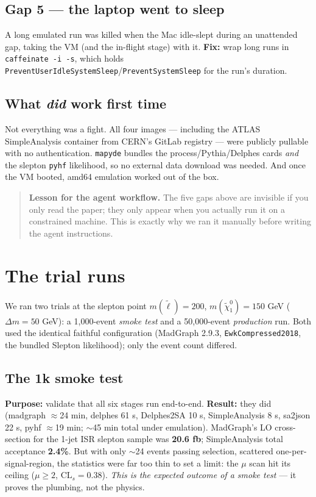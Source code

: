 \documentclass[11pt,oneside]{report}
\newcommand{\code}[1]{\texttt{#1}}
\begin{document}
\section{Gap 5 --- the laptop went to sleep}
A long emulated run was killed when the Mac idle-slept during an unattended gap, taking the VM (and
the in-flight stage) with it. \textbf{Fix:} wrap long runs in \code{caffeinate -i -s}, which holds
\code{PreventUserIdleSystemSleep}/\code{PreventSystemSleep} for the run's duration.

\section{What \emph{did} work first time}
Not everything was a fight. All four images --- including the ATLAS SimpleAnalysis container from
CERN's GitLab registry --- were publicly pullable with no authentication. \code{mapyde} bundles the
process/Pythia/Delphes cards \emph{and} the slepton \code{pyhf} likelihood, so no external data
download was needed. And once the VM booted, amd64 emulation worked out of the box.

\begin{quote}\textbf{Lesson for the agent workflow.} The five gaps above are invisible if you only
read the paper; they only appear when you actually run it on a constrained machine. This is exactly
why we ran it manually before writing the agent instructions.\end{quote}

\chapter{The trial runs}
\label{ch:runs}
We ran two trials at the slepton point $m(\tilde\ell)=200$, $m(\tilde\chi^0_1)=150$ GeV
($\Delta m = 50$ GeV): a 1{,}000-event \emph{smoke test} and a 50{,}000-event \emph{production} run.
Both used the identical faithful configuration (MadGraph 2.9.3, \code{EwkCompressed2018}, the bundled
Slepton likelihood); only the event count differed.

\section{The 1k smoke test}
\textbf{Purpose:} validate that all six stages run end-to-end. \textbf{Result:} they did
(madgraph $\approx$24 min, delphes 61 s, Delphes2SA 10 s, SimpleAnalysis 8 s, sa2json 22 s,
pyhf $\approx$19 min; $\sim$45 min total under emulation). MadGraph's LO cross-section for the
1-jet ISR slepton sample was \textbf{20.6 fb}; SimpleAnalysis total acceptance \textbf{2.4\%}.
But with only $\sim$24 events passing selection, scattered one-per-signal-region, the statistics
were far too thin to set a limit: the $\mu$ scan hit its ceiling ($\mu\ge2$, $\mathrm{CL}_s=0.38$).
\emph{This is the expected outcome of a smoke test} --- it proves the plumbing, not the physics.
\end{document}
